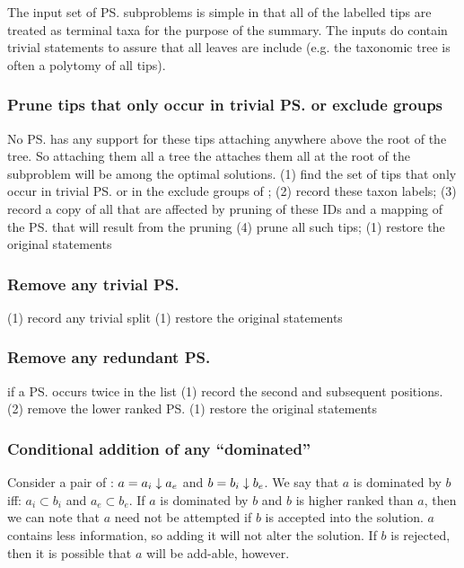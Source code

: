 \documentclass[11pt]{article}
\begin{document}
The input set of \ps subproblems is simple in that all of the labelled tips are treated
    as terminal taxa for the purpose of the summary.
The inputs do contain trivial statements to assure that all leaves are include (e.g. 
     the taxonomic tree is often a polytomy of all tips).

\subsubsection{Prune tips that only occur in trivial \ps or exclude groups}
No \ps has any support for these tips attaching anywhere above the root of the tree.
So attaching them all a tree the attaches them all at the  root of the subproblem will
    be among the optimal solutions.
\simplification (1) find the set of tips that only occur in trivial \ps or in the exclude
    groups of \pss;
    (2) record these taxon labels;
    (3) record a copy of all \pss that are affected by pruning of these IDs and a mapping
        of the \ps that will result from the pruning
    (4) prune all such tips;
\undoActions (1) restore the original statements

\subsubsection{Remove any trivial \ps}
\simplification (1) record any trivial split
\undoActions (1) restore the original statements

\subsubsection{Remove any redundant \ps}
\simplification if a \ps occurs twice in the list (1) record the second and subsequent positions. (2) remove the lower ranked \ps
\undoActions (1) restore the original statements

\subsubsection{Conditional addition of any ``dominated'' \pss}
Consider a pair of \pss: $a={a_i}\downarrow{a_e}$ and $b={b_i}\downarrow{b_e}$.
We say that $a$ is dominated by $b$ iff: 
    $a_i \subset b_i$ and $a_e\subset b_e$.
If $a$ is dominated by $b$ and $b$ is higher ranked than $a$, then we can 
    note that $a$ need not be attempted if $b$ is accepted into the solution.
$a$ contains less information, so adding it will not alter the solution.
If $b$ is rejected, then it is possible that $a$ will be add-able, however.
\end{document}
